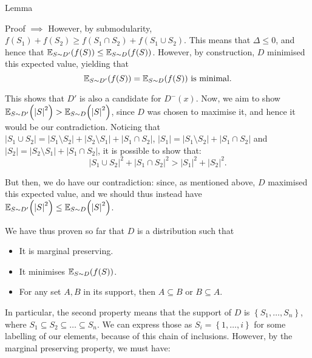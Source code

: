 \documentclass[a4paper]{article}
\begin{document}
\begin{parag}{Lemma}
\begin{subparag}{Proof $\implies$}
        However, by submodularity, $f\left(S_1\right) + f\left(S_2\right) \geq f\left(S_1 \cap S_2\right) + f\left(S_1 \cup S_2\right)$. This means that $\Delta \leq 0$, and hence that $\exval_{S \followsdistr D'}\left(f\left(S\right)\right) \leq \exval_{S \followsdistr D}\left(f\left(S\right)\right)$. However, by construction, $D$ minimised this expected value, yielding that
        \[\exval_{S \followsdistr D'}\left(f\left(S\right)\right) = \exval_{S \followsdistr D}\left(f\left(S\right)\right) \text{ is minimal}.\]

        This shows that $D'$ is also a candidate for $D^-\left(x\right)$. Now, we aim to show $\exval_{S \followsdistr D'}\left(\left|S\right|^2\right) > \exval_{S \followsdistr D}\left(\left|S\right|^2\right)$, since $D$ was chosen to maximise it, and hence it would be our contradiction. Noticing that $\left|S_1 \cup S_2\right| = \left|S_1 \setminus S_2\right| + \left|S_2 \setminus S_1\right| + \left|S_1 \cap S_2\right|$, $\left|S_1\right| = \left|S_1 \setminus S_2\right| + \left|S_1 \cap S_2\right|$ and $\left|S_2\right| = \left|S_2 \setminus S_1\right| + \left|S_1 \cap S_2\right|$, it is possible to show that: 
        \[\left|S_1 \cup S_2\right|^2 + \left|S_1 \cap S_2\right|^2 > \left|S_1\right|^2 + \left|S_2\right|^2.\]

        But then, we do have our contradiction: 
        since, as mentioned above, $D$ maximised this expected value, and we should thus instead have $\exval_{S \followsdistr D'}\left(\left|S\right|^2\right) \leq \exval_{S \followsdistr D}\left(\left|S\right|^2\right)$.

        We have thus proven so far that $D$ is a distribution such that
        \begin{itemize}
            \item It is marginal preserving.
            \item It minimises $\exval_{S \followsdistr D}\left(f\left(S\right)\right)$.
            \item For any set $A, B$ in its support, then $A \subseteq B$ or $B \subseteq A$.
        \end{itemize}

        In particular, the second property means that the support of $D$ is $\left\{S_1, \ldots, S_n\right\}$, where $S_1 \subseteq S_2 \subseteq \ldots \subseteq S_n$. We can express those as $S_i = \left\{1, \ldots, i\right\}$ for some labelling of our elements, because of this chain of inclusions. However, by the marginal preserving property, we must have:


\end{subparag}
\end{parag}
\end{document}
